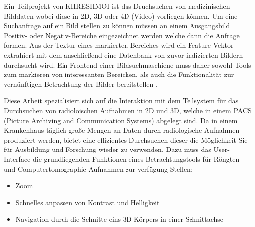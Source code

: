 Ein Teilprojekt von KHRESHMOI ist das Druchsuchen von medizinischen Bilddaten wobei diese in 2D, 3D oder 4D (Video) vorliegen können.
Um eine Suchanfrage auf ein Bild stellen zu können müssen an einem Ausgangsbild Positiv- oder Negativ-Bereiche eingezeichnet werden welche dann die Anfrage formen.
Aus der Textur eines markierten Bereiches wird ein Feature-Vektor extrahiert mit dem anschließend eine Datenbank von zuvor indizierten Bildern durchsucht wird.
%
Ein Frontend einer Bildsuchmaschiene muss daher sowohl Tools zum markieren von interessanten Bereichen, 
als auch die Funktionalität zur vernünftigen Betrachtung der Bilder bereitstellen \cite{kres}.

Diese Arbeit spezialisiert sich auf die Interaktion mit dem Teilsystem für das Durchsuchen von radioloischen Aufnahmen in 2D und 3D,
welche in einem PACS (Picture Archiving and Communication Systems) abgelegt sind.
Da in einem Krankenhaus täglich große Mengen an Daten durch radiologische Aufnahmen produziert werden, 
bietet eine effizientes Durchsuchen dieser die Möglichkeit Sie für Ausbildung und Forschung wieder zu verwenden.
%
Dazu muss das User-Interface die grundliegenden Funktionen eines Betrachtungstools für Röngten- und Computertomographie-Aufnahmen zur verfügung Stellen:
\begin{itemize}
	\item Zoom
	\item Schnelles anpassen von Kontrast und Helligkeit
	\item Navigation durch die Schnitte eins 3D-Körpers in einer Schnittachse
\end{itemize}
\cite{pacs}


